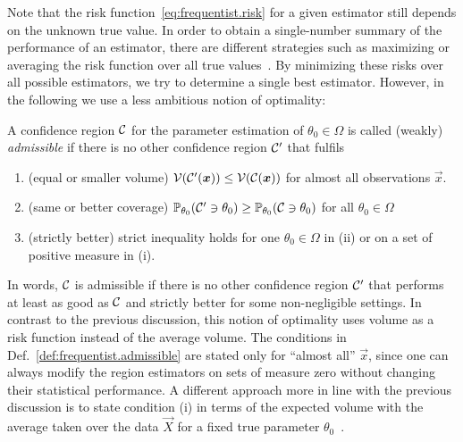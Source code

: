 Note that the risk function~\eqref{eq:frequentist.risk} for a given estimator still depends on the unknown true value.
In order to obtain a single-number summary of the performance of an estimator, there are different strategies such as maximizing or averaging the risk function over all true values~\cite[Sec.\ 12.2]{Wasserman_2013_All}.
By minimizing these risks over all possible estimators, we try to determine a single best estimator.
However, in the following we use a less ambitious notion of optimality:
\begin{definition}{\cite[Def. 2.2]{Joshi_1969_Admissibility}}
  \label{def:frequentist.admissible}
  A confidence region $\mathcal{C}$ for the parameter estimation of $\theta_0 \in \Omega$ is called (weakly) \emph{admissible} if there is no other confidence region $\mathcal{C}'$ that fulfils
  \begin{enumerate}
    \item(equal or smaller volume) $\mathcal{V}(\mathcal{C}'(\boldsymbol{x})) \le \mathcal{V}(\mathcal{C}(\boldsymbol{x}))$ for almost all observations $\vec x$.
    \item(same or better coverage) $\mathbb{P}_{\theta_0}(\mathcal{C}' \owns \theta_0) \ge \mathbb{P}_{\theta_0}(\mathcal{C} \owns \theta_0)$ for all $\theta_0 \in \Omega$
    \item(strictly better) strict inequality holds for one $\theta_0 \in \Omega$ in (ii) or on a set of positive measure in (i).
  \end{enumerate}
\end{definition}
In words, $\mathcal{C}$ is admissible if there is no other confidence region $\mathcal{C}'$ that performs at least as good as $\mathcal{C}$ and strictly better for some non-negligible settings.
In contrast to the previous discussion, this notion of optimality uses  volume as a risk function instead of the average volume.
The conditions in Def.~\ref{def:frequentist.admissible} are stated only for ``almost all'' $\vec x$, since one can always modify the region estimators on sets of measure zero without changing their statistical performance.
A different approach more in line with the previous discussion is to state condition (i) in terms of the expected volume with the average taken over the data $\vec X$ for a fixed true parameter $\theta_0$~\cite[Def.~7.1]{Joshi_1969_Admissibility}.



